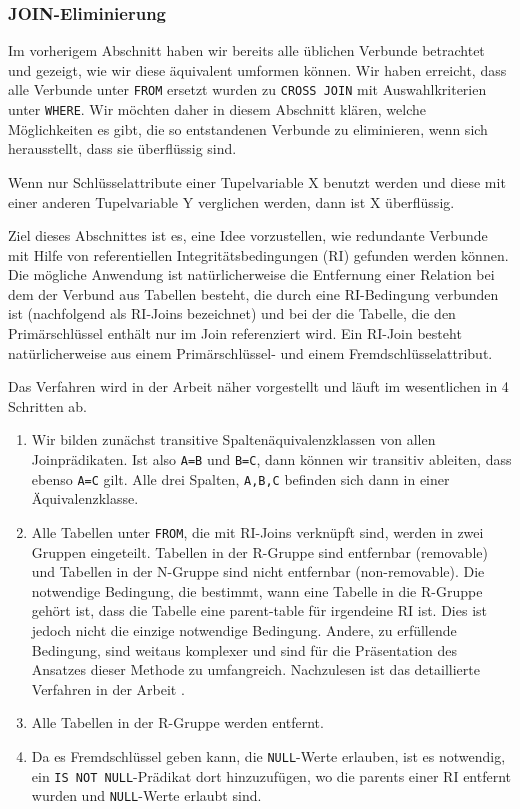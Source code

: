 \subsubsection{JOIN-Eliminierung}

Im vorherigem Abschnitt haben wir bereits alle üblichen Verbunde betrachtet und gezeigt, wie wir diese äquivalent umformen können. Wir haben erreicht, dass alle Verbunde unter \verb|FROM| ersetzt wurden zu \verb|CROSS JOIN| mit Auswahlkriterien unter \verb|WHERE|. Wir möchten daher in diesem Abschnitt klären, welche Möglichkeiten es gibt, die so entstandenen Verbunde zu eliminieren, wenn sich herausstellt, dass sie überflüssig sind.

Wenn nur Schlüsselattribute einer Tupelvariable X benutzt werden und diese mit  einer anderen Tupelvariable Y verglichen werden, dann ist X überflüssig.

Ziel dieses Abschnittes ist es, eine Idee vorzustellen, wie redundante Verbunde mit Hilfe von referentiellen Integritätsbedingungen (RI) gefunden werden können. 
Die mögliche Anwendung ist natürlicherweise die Entfernung einer Relation bei dem der Verbund aus Tabellen besteht, die durch eine RI-Bedingung verbunden ist (nachfolgend als RI-Joins bezeichnet) und bei der die Tabelle, die den Primärschlüssel enthält nur im Join referenziert wird. Ein RI-Join besteht natürlicherweise aus einem Primärschlüssel- und einem Fremdschlüsselattribut.

Das Verfahren wird in der Arbeit \cite{joinelem2} näher vorgestellt und läuft im wesentlichen in 4 Schritten ab.

\begin{enumerate}
\item Wir bilden zunächst transitive Spaltenäquivalenzklassen von allen Joinprädikaten. Ist also \verb|A=B| und \verb|B=C|, dann können wir transitiv ableiten, dass ebenso \verb|A=C| gilt. Alle drei Spalten, \verb|A,B,C| befinden sich dann in einer Äquivalenzklasse.

\item Alle Tabellen unter \verb|FROM|, die mit RI-Joins verknüpft sind, werden in zwei Gruppen eingeteilt. Tabellen in der R-Gruppe sind entfernbar (removable) und Tabellen in der N-Gruppe sind nicht entfernbar (non-removable). Die notwendige Bedingung, die bestimmt, wann eine Tabelle in die R-Gruppe gehört ist, dass die Tabelle eine parent-table für irgendeine RI ist. Dies ist jedoch nicht die einzige notwendige Bedingung. Andere, zu erfüllende Bedingung, sind weitaus komplexer und sind für die Präsentation des Ansatzes dieser Methode zu umfangreich. Nachzulesen ist das detaillierte Verfahren in der Arbeit \cite{joinelem2}.

\item Alle Tabellen in der R-Gruppe werden entfernt.

\item Da es Fremdschlüssel geben kann, die \verb|NULL|-Werte erlauben, ist es notwendig, ein \verb|IS NOT NULL|-Prädikat dort hinzuzufügen, wo die parents einer RI entfernt wurden und \verb|NULL|-Werte erlaubt sind.
\end{enumerate}


